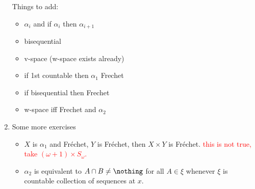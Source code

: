 \documentclass{article}
\begin{document}
\begin{enumerate}
    Things to add:
    \begin{itemize}
        \item \(\alpha_i\) and if \(\alpha_i\) then \(\alpha_{i + 1}\)
        \item bisequential
        \item v-space (w-space exists already)
        \item if 1st countable then \(\alpha_1\) Frechet
        \item if bisequential then Frechet
        \item w-space iff Frechet and \(\alpha_2\)   
    \end{itemize}
    \item Some more exercises 
    \begin{itemize}
        \item \(X\) is \(\alpha_1\) and Fréchet, \(Y\) is Fréchet, then \(X \times Y\) is Fréchet. \textcolor{red}{this is not true, take $(\omega + 1) \times S_{\omega}$.}
        \item \(\alpha_2\) is equivalent to \(A \cap B \neq \nothing\) for all \(A \in \xi\) whenever \(\xi\) is countable collection of sequences at \(x\). \checkmark
    \end{itemize}
\end{enumerate}
\end{document}

